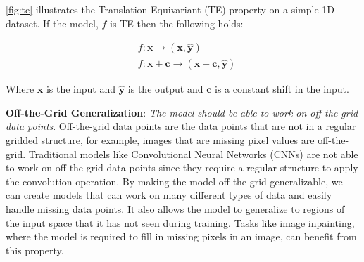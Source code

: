 \documentclass[../../main.tex]{subfiles}
\begin{document}

\autoref{fig:te} illustrates the Translation Equivariant (TE) property on a simple 1D dataset. If the model, $f$ is TE then the following holds:

\begin{align}
	&f: \bm{x} \rightarrow (\bm{x}, \bm{\hat{y}}) \\
	&f: \bm{x} + \bm{c} \rightarrow (\bm{x} + \bm{c}, \bm{\hat{y}})
\end{align}

Where $\bm{x}$ is the input and $\bm{\hat{y}}$ is the output and $\bm{c}$ is a constant shift in the input.


\textbf{Off-the-Grid Generalization}: \emph{The model should be able to work on off-the-grid data points}. Off-the-grid data points are the data points that are not in a regular gridded structure, for example, images that are missing pixel values are off-the-grid. Traditional models like Convolutional Neural Networks (CNNs) are not able to work on off-the-grid data points since they require a regular structure to apply the convolution operation. By making the model off-the-grid generalizable, we can create models that can work on many different types of data and easily handle missing data points. It also allows the model to generalize to regions of the input space that it has not seen during training. Tasks like image inpainting, where the model is required to fill in missing pixels in an image, can benefit from this property.






\ifSubfilesClassLoaded{%
    \printbibliography{}
}{} 
\end{document}
